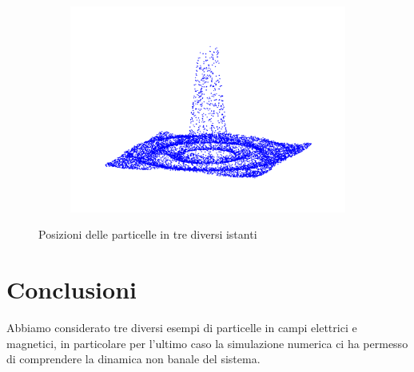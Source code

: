 \begin{figure}
\begin{subfigure}{0.33\textwidth}
    \includegraphics[width=1.\textwidth]{img/distrib_160.png}
\end{subfigure}
\caption[short]{Posizioni delle particelle in tre diversi istanti}
\end{figure}


\section{Conclusioni}
Abbiamo considerato tre diversi esempi di particelle in campi elettrici e magnetici, in particolare per l'ultimo caso la simulazione numerica ci ha permesso di comprendere la dinamica non banale del sistema.
